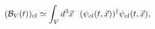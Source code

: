 \begin{equation}
\label{classicalnumber}
({\cal B}_V(t))_{cl} \simeq \int_V d^3{\vec x} \hspace{0.1in} 
(\psi_{cl}(t,{\vec x}))^{\dagger} \psi_{cl}(t,{\vec x}), 
\end{equation}


